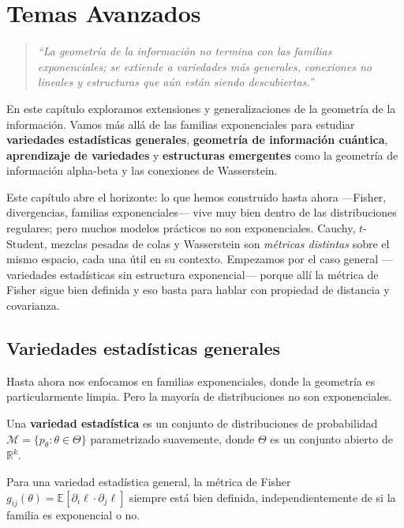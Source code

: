 
\chapter{Temas Avanzados}

\begin{quotation}
	\itshape
	``La geometría de la información no termina con las familias exponenciales; se extiende a variedades más generales, conexiones no lineales y estructuras que aún están siendo descubiertas.''
\end{quotation}

En este capítulo exploramos extensiones y generalizaciones de la geometría de la información.  Vamos más allá de las familias exponenciales para estudiar \textbf{variedades estadísticas generales}, \textbf{geometría de información cuántica}, \textbf{aprendizaje de variedades} y \textbf{estructuras emergentes} como la geometría de información alpha-beta y las conexiones de Wasserstein.

\bigskip
\noindent
Este capítulo abre el horizonte: lo que hemos construido hasta ahora ---Fisher, divergencias, familias exponenciales--- vive muy bien dentro de las distribuciones regulares; pero muchos modelos prácticos no son exponenciales. Cauchy, $t$-Student, mezclas pesadas de colas y Wasserstein son \emph{métricas distintas} sobre el mismo espacio, cada una útil en su contexto. Empezamos por el caso general ---variedades estadísticas sin estructura exponencial--- porque allí la métrica de Fisher sigue bien definida y eso basta para hablar con propiedad de distancia y covarianza.

\section{Variedades estadísticas generales}

Hasta ahora nos enfocamos en familias exponenciales, donde la geometría es particularmente limpia.  Pero la mayoría de distribuciones no son exponenciales.

\begin{definition}
	Una \textbf{variedad estadística} es un conjunto de distribuciones de probabilidad $\mathcal{M} = \{p_\theta : \theta \in \Theta\}$ parametrizado suavemente, donde $\Theta$ es un conjunto abierto de $\mathbb{R}^k$.
\end{definition}

\begin{proposition}
	Para una variedad estadística general, la métrica de Fisher $g_{ij}(\theta) = \mathbb{E}[\partial_i \ell \cdot \partial_j \ell]$ siempre está bien definida, independientemente de si la familia es exponencial o no.
\end{proposition}

